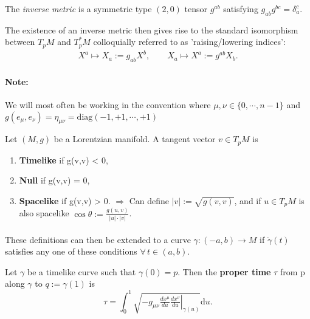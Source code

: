 \documentclass[11pt,fleqn]{report}
\begin{document}
\begin{definition}
The \textit{inverse metric} is a symmetric type $(2,0)$ tensor $g^{ab}$ satisfying $g_{ab}g^{bc} = \delta_a^c$.
\end{definition}
\begin{remark}
The existence of an inverse metric then gives rise to the standard isomorphism between $T_pM$ and $T_p^*M$ colloquially referred to as 'raising/lowering indices':\begin{align}
X^a \mapsto X_a := g_{ab}X^b, \qquad X_a \mapsto X^a:=g^{ab}X_b.
\end{align}
\end{remark}

\paragraph{Note:} We will most often be working in the convention where $\mu,\nu \in \{0,\cdots,n-1\}$ and $g(e_\mu,e_\nu)=\eta_{\mu\nu} = \mathrm{diag}(-1,+1,\cdots,+1)$

\begin{definition}
Let $(M,g)$ be a Lorentzian manifold. A tangent vector $v \in T_pM$ is \begin{enumerate}
\item \textbf{Timelike} if g(v,v) < 0,
\item \textbf{Null} if g(v,v) = 0,
\item \textbf{Spacelike} if g(v,v) > 0. $\Rightarrow$ Can define $|v|:=\sqrt{g(v,v)}$, and if $u\in T_pM$ is also spacelike $\cos \theta:= \tfrac{g(u,v)}{|u|\cdot|v|}$.
\end{enumerate}
\end{definition}

\paragraph{}These definitions can then be extended to a curve $\gamma:(-a,b) \to M$ if $\dot{\gamma}(t)$ satisfies any one of these conditions $\forall \, t \in (a,b)$.

\begin{definition}
Let $\gamma$ be a timelike curve such that $\gamma(0)=p$. Then the \textbf{proper time} $\tau$ from p along $\gamma$ to $q:=\gamma(1)$ is \begin{equation}
\tau = \int_0^1\sqrt{\left. -g_{\mu\nu}\tfrac{dx^\mu}{du}\tfrac{dx^\nu}{du} \right\vert_{\gamma(u)}}\mathrm{d}u.
\end{equation}
\end{definition}
\end{document}

